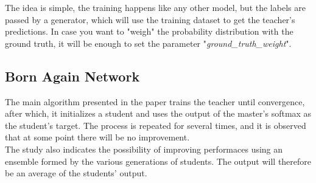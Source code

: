 The idea is simple, the training happens like any other model, but the labels are passed by a generator, which will use the training dataset to get the teacher's predictions. In case you want to "weigh" the probability distribution with the ground truth, it will be enough to set the parameter "\textit{ground\_truth\_weight}".
\newpage
\subsection{Born Again Network}

The main algorithm presented in the paper\cite{ban} trains the teacher until convergence, after which, it initializes a student and uses the output of the master's softmax as the student's target. The process is repeated for several times, and it is observed that at some point there will be no improvement.\\
The study also indicates the possibility of improving performaces using an ensemble formed by the various generations of students. The output will therefore be an average of the students' output.

